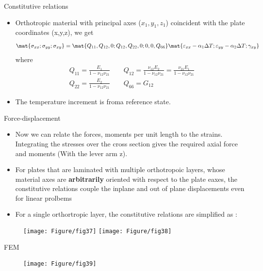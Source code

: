 	\begin{frame}{Constitutive relations}
		\begin{itemize}
			\item Orthotropic material with principal axes ($x_1,y_1,z_1$) coincident with the plate coordinates (x,y,z), we get
			\begin{equation}
			\mat{\sigma_{xx};\sigma_{yy};\sigma_{xy}} = \mat{Q_{11},Q_{12},0;Q_{12},Q_{22},0;0,0,Q_{66}}
			\mat{\varepsilon_{xx} - \alpha_1\Delta T;\varepsilon_{yy} - \alpha_2\Delta T;\gamma_{xy}}
			\end{equation}
			where 
			\begin{equation}
			\begin{aligned}
			Q_{11} =  \frac{E_1}{1-\nu_{12}\nu_{21}} \qquad Q_{12} =  \frac{\nu_{12} E_2}{1-\nu_{12}\nu_{21}} = \frac{\nu_{21} E_1}{1-\nu_{12}\nu_{21}} \\
			Q_{22} = \frac{E_2}{1-\nu_{12}\nu_{21}} \qquad Q_{66} = G_{12}
			\end{aligned}
			\end{equation}
			\item The temperature increment is froma reference state.
		\end{itemize}
	\end{frame}


	\begin{frame}{Force-displacement}
		\begin{itemize}
			\item Now we can relate the forces, moments per unit length to the strains. Integrating the stresses over the cross section gives the required axial force and moments (With the lever arm z). 
			\item For plates that are laminated with multiple orthotropoic layers, whose material axes are \textbf{arbitrarily} oriented with respect to the plate eaxes, the constitutive relations couple the inplane and out of plane displacements even for linear prolbems
			\item For a single orthortropic layer, the constitutive relations are simplified as :
		\end{itemize}
		\begin{figure}
			\centering
			\texttt{[image: Figure/fig37]}  	
			\texttt{[image: Figure/fig38]}	
		\end{figure}
	\end{frame}


	\begin{frame}{FEM}
		\begin{figure}
			\centering
			\texttt{[image: Figure/fig39]}  		
		\end{figure}
	\end{frame}


